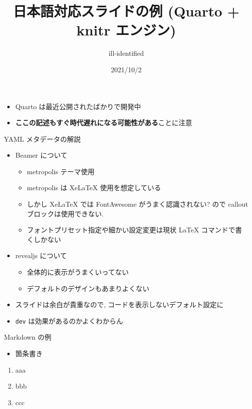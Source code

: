 \documentclass[
  ignorenonframetext,
]{beamer}
\title{日本語対応スライドの例 (Quarto + knitr エンジン)}
\author{ill-identified}
\date{2021/10/2}
\providecommand{\tightlist}{%
  \setlength{\itemsep}{0pt}\setlength{\parskip}{0pt}}
\begin{document}
\frame{\titlepage}

\begin{frame}{}
\protect\hypertarget{section}{}
\begin{itemize}
\tightlist
\item
  Quarto は最近公開されたばかりで開発中
\item
  \textbf{ここの記述もすぐ時代遅れになる可能性がある}ことに注意
\end{itemize}
\end{frame}

\begin{frame}[fragile]{YAML メタデータの解説}
\protect\hypertarget{yaml-ux30e1ux30bfux30c7ux30fcux30bfux306eux89e3ux8aac}{}
\begin{itemize}
\tightlist
\item
  Beamer について

  \begin{itemize}
  \tightlist
  \item
    metropolis テーマ使用
  \item
    metropolis は XeLaTeX 使用を想定している
  \item
    しかし XeLaTeX では FontAwesome がうまく認識されない? ので callout
    ブロックは使用できない.
  \item
    フォントプリセット指定や細かい設定変更は現状 LaTeX
    コマンドで書くしかない
  \end{itemize}
\item
  revealjs について

  \begin{itemize}
  \tightlist
  \item
    全体的に表示がうまくいってない
  \item
    デフォルトのデザインもあまりよくない
  \end{itemize}
\item
  スライドは余白が貴重なので, コードを表示しないデフォルト設定に
\item
  \texttt{dev} は効果があるのかよくわからん
\end{itemize}
\end{frame}

\begin{frame}{Markdown の例}
\protect\hypertarget{markdown-ux306eux4f8b}{}
\begin{itemize}
\tightlist
\item
  箇条書き
\end{itemize}

\begin{enumerate}
\tightlist
\item
  aaa
\item
  bbb
\item
  ccc
\end{enumerate}
\end{frame}
\end{document}
